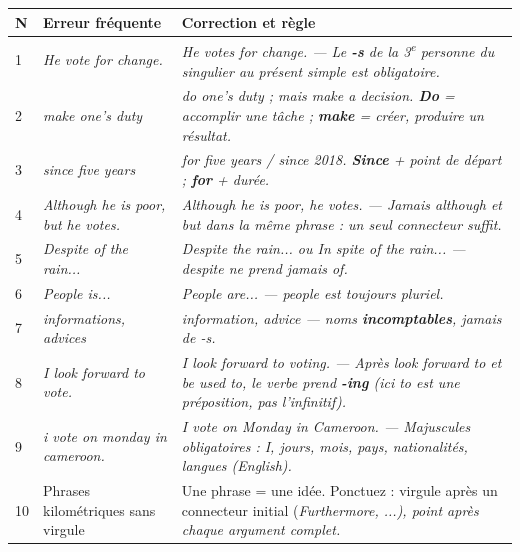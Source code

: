 \documentclass[11pt]{article}
\newcommand{\eng}[1]{\ifmmode\text{\textit{#1}}\else\begingroup\selectlanguage{english}\itshape #1\endgroup\fi}
\begin{document}
\begin{center}
\begin{tabularx}{\linewidth}{|l|X|X|}\hline
\rowcolor{popblueL} \textbf{N} & \textbf{Erreur fréquente} & \textbf{Correction et règle} \\ \hline
1 & \eng{He vote for change.} & \eng{He votes for change.} — Le \textbf{-s} de la 3\textsuperscript{e} personne du singulier au présent simple est obligatoire. \\ \hline
2 & \eng{make one's duty} & \eng{do one's duty} ; mais \eng{make a decision}. \textbf{Do} = accomplir une tâche ; \textbf{make} = créer, produire un résultat. \\ \hline
3 & \eng{since five years} & \eng{for five years} / \eng{since 2018}. \textbf{Since} + point de départ ; \textbf{for} + durée. \\ \hline
4 & \eng{Although he is poor, but he votes.} & \eng{Although he is poor, he votes.} — Jamais \eng{although} et \eng{but} dans la même phrase : un seul connecteur suffit. \\ \hline
5 & \eng{Despite of the rain...} & \eng{Despite the rain...} ou \eng{In spite of the rain...} — \eng{despite} ne prend jamais \eng{of}. \\ \hline
6 & \eng{People is...} & \eng{People are...} — \eng{people} est toujours pluriel. \\ \hline
7 & \eng{informations, advices} & \eng{information, advice} — noms \textbf{incomptables}, jamais de -s. \\ \hline
8 & \eng{I look forward to vote.} & \eng{I look forward to voting.} — Après \eng{look forward to} et \eng{be used to}, le verbe prend \textbf{-ing} (ici \eng{to} est une préposition, pas l'infinitif). \\ \hline
9 & \eng{i vote on monday in cameroon.} & \eng{I vote on Monday in Cameroon.} — Majuscules obligatoires : \eng{I}, jours, mois, pays, nationalités, langues (\eng{English}). \\ \hline
10 & Phrases kilométriques sans virgule & Une phrase = une idée. Ponctuez : virgule après un connecteur initial (\eng{Furthermore, ...}), point après chaque argument complet. \\ \hline
\end{tabularx}
\end{center}
\end{document}
